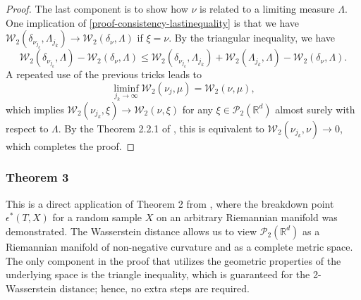 \documentclass[11pt]{article}
\newcommand{\calP}{\mathcal{P}}
\newcommand{\calW}{\mathcal{W}}
\newcommand{\bbR}{\mathbb{R}}
\begin{document}
\begin{proof}
	The last component is to show how $\nu$ is related to a limiting measure $\Lambda$. One implication of \eqref{proof-consistency-lastinequality} is that we have $\calW_2 (\delta_{\nu_{j_k}}, \Lambda_{j_k}) \rightarrow \calW_2 (\delta_\nu, \Lambda)$ if $\xi = \nu$. By the triangular inequality, we have
	\begin{equation*}
	\calW_2 (\delta_{\nu_{j_k}}, \Lambda) - \calW_2 (\delta_{\nu}, \Lambda) \leq \calW_2 (\delta_{\nu_{j_k}}, \Lambda_{j_k}) + \calW_2 (\Lambda_{j_k}, \Lambda) - \calW_2 (\delta_{\nu}, \Lambda). 
	\end{equation*}
	A repeated use of the previous tricks leads to 
	\begin{equation*}
	\liminf_{j_k \rightarrow \infty} \calW_2 (\nu_j, \mu) = \calW_2 (\nu, \mu),
	\end{equation*}
	which implies $\calW_2 (\nu_{j_k}, \xi) \rightarrow \calW_2 (\nu, \xi)$ for any $\xi \in \calP_2 (\bbR^d)$ almost surely with respect to $\Lambda$. By the Theorem 2.2.1 of \cite{panaretos_2020_InvitationStatisticsWasserstein}, this is equivalent to $\calW_2 (\nu_{j_k}, \nu) \rightarrow 0$, which completes the proof. 
\end{proof}


\subsubsection*{Theorem 3}
This is a direct application of Theorem 2 from \cite{fletcher_2004_PrincipalGeodesicAnalysis}, where the breakdown point $\epsilon^*(T,X)$ for a random sample $X$ on an arbitrary Riemannian manifold was demonstrated. The Wasserstein distance allows us to view $\calP_2(\mathbb{R}^d)$ as a Riemannian manifold of non-negative curvature and as a complete metric space. The only component in the proof that utilizes the geometric properties of the underlying space is the triangle inequality, which is guaranteed for the 2-Wasserstein distance; hence, no extra steps are required. 
\end{document}
